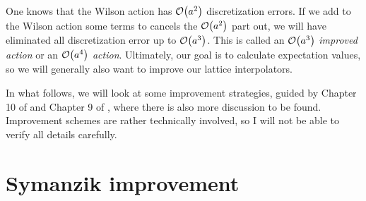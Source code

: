 One knows that the Wilson action has
$\order{a^2}$ discretization errors. If we add to the Wilson action some
terms to cancels the $\order{a^2}$ part out, we will have eliminated all 
discretization error
up to $\order{a^3}$. This is called an $\order{a^3}$ {\it improved action}
or an $\order{a^4}$ {\it action}. Ultimately, our goal is to calculate
expectation values, so we will generally also want to improve our 
lattice interpolators. 

In what follows, we will look at some improvement strategies, guided by 
Chapter 10 of \cite{degrand_lattice_2006} and Chapter 9 of
\cite{gattringer_quantum_2010}, where there is also more discussion to 
be found. Improvement schemes are rather technically
involved, so I will not be able to verify all details carefully.

\section{Symanzik improvement}\label{sec:symanzikImprovement}

